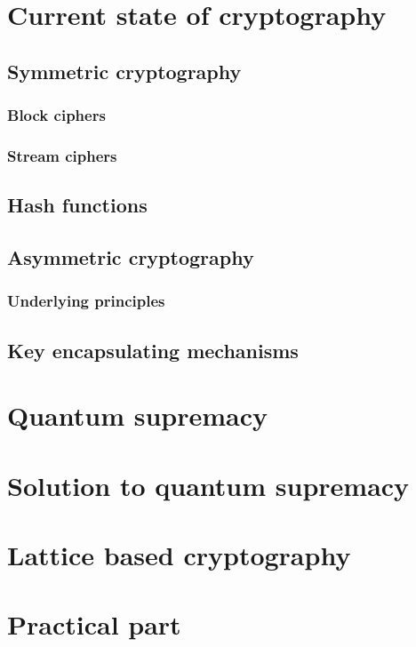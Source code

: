 \chapter{Current state of cryptography}
\label{ch:state_of_crypto}


\section{Symmetric cryptography}
\label{sec:symmetric_enc}


\subsection{Block ciphers}
\label{subsec:block_ciphers}


\subsection{Stream ciphers}
\label{subsec:stream_ciphers}


\section{Hash functions}
\label{sec:hash_functions}


\section{Asymmetric cryptography}
\label{sec:asymmetric_enc}


\subsection{Underlying principles}
\label{subsec:underlying_principles}


\section{Key encapsulating mechanisms}
\label{sec:kem}


\chapter{Quantum supremacy}
\label{chapt:quantum_supr}


\chapter{Solution to quantum supremacy}


\chapter{Lattice based cryptography}


\chapter{Practical part}
